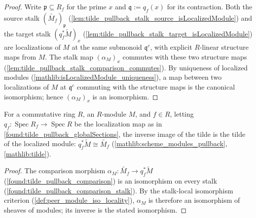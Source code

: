 \begin{proof}
  Write \(\mathfrak p\subseteq R_f\) for the prime \(x\) and \(\mathfrak q:=q_f(x)\) for its
  contraction.  Both the source stalk \((\widetilde{M_f})_{\mathfrak p}\)
  (\cref{lem:tilde_pullback_stalk_source_isLocalizedModule}) and the target stalk
  \((q_f^{*}\widetilde M)_x\)
  (\cref{lem:tilde_pullback_stalk_target_isLocalizedModule}) are localizations of \(M\) at
  the same submonoid \(\mathfrak q^{c}\), with explicit \(R\)-linear structure maps from
  \(M\).  The stalk map \((\alpha_M)_x\) commutes with these two structure maps
  (\cref{lem:tilde_pullback_stalk_comparison_commutes}).  By uniqueness of localized
  modules (\cref{mathlib:isLocalizedModule_uniqueness}), a map between two localizations of
  \(M\) at \(\mathfrak q^{c}\) commuting with the structure maps is the canonical
  isomorphism; hence \((\alpha_M)_x\) is an isomorphism.
\end{proof}

\begin{lemma}
  \label{found:tilde_pullback_iso}
  For a commutative ring \(R\), an \(R\)-module \(M\), and \(f\in R\), letting
  \(q_f:\operatorname{Spec}R_f\to\operatorname{Spec}R\) be the localization map as in
  \cref{found:tilde_pullback_globalSections}, the inverse image of the tilde is the
  tilde of the localized module:
  \(q_f^{*}\widetilde M\cong\widetilde{M_f}\)
  (\cref{mathlib:scheme_modules_pullback}, \cref{mathlib:tilde}).
\end{lemma}

\begin{proof}
  The comparison morphism \(\alpha_M:\widetilde{M_f}\to q_f^{*}\widetilde M\)
  (\cref{found:tilde_pullback_comparison}) is an isomorphism on every stalk
  (\cref{found:tilde_pullback_comparison_stalk}).  By the stalk-local isomorphism
  criterion (\cref{def:peer_module_iso_locality}), \(\alpha_M\) is therefore an
  isomorphism of sheaves of modules; its inverse is the stated isomorphism.
\end{proof}

